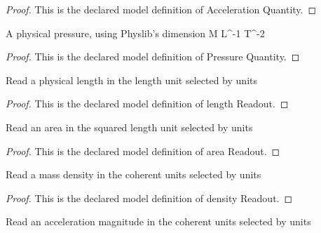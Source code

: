 \begin{proof}
  This is the declared model definition of Acceleration Quantity.
\end{proof}
\begin{definition}
  \label{def:physics:phyx-mini-0665:phyxminiproblems-problemphyxmini0665-pressurequantity}
  A physical pressure, using Physlib's dimension M L\textasciicircum{}-1 T\textasciicircum{}-2
\end{definition}
\begin{proof}
  This is the declared model definition of Pressure Quantity.
\end{proof}
\begin{definition}
  \label{def:physics:phyx-mini-0665:phyxminiproblems-problemphyxmini0665-lengthreadout}
  Read a physical length in the length unit selected by units
\end{definition}
\begin{proof}
  This is the declared model definition of length Readout.
\end{proof}
\begin{definition}
  \label{def:physics:phyx-mini-0665:phyxminiproblems-problemphyxmini0665-areareadout}
  Read an area in the squared length unit selected by units
\end{definition}
\begin{proof}
  This is the declared model definition of area Readout.
\end{proof}
\begin{definition}
  \label{def:physics:phyx-mini-0665:phyxminiproblems-problemphyxmini0665-densityreadout}
  Read a mass density in the coherent units selected by units
\end{definition}
\begin{proof}
  This is the declared model definition of density Readout.
\end{proof}
\begin{definition}
  \label{def:physics:phyx-mini-0665:phyxminiproblems-problemphyxmini0665-accelerationreadout}
  Read an acceleration magnitude in the coherent units selected by units
\end{definition}
